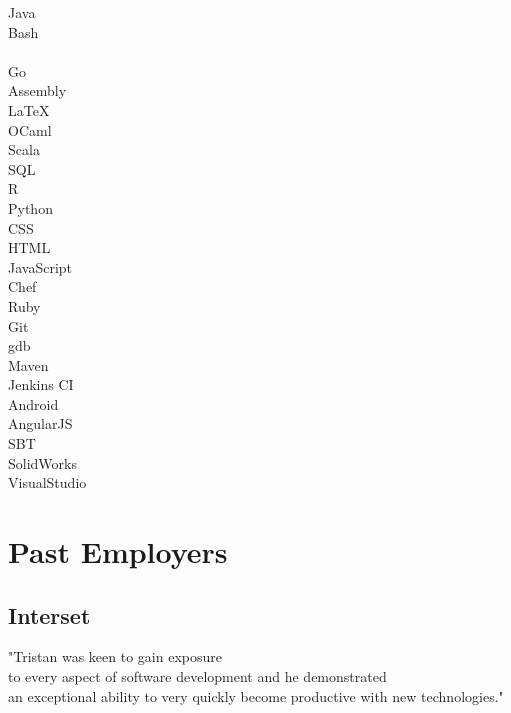 \documentclass[letterpaper]{deedy-resume-modified} %
\begin{document}
\begin{minipage}[t]{0.32\textwidth}
Java \tab {\bf + + + + +}\\
Bash \tab {\bf + + + + +}\\
\CPP \tab {\bf + + + +}\\
Go \tab {\bf + + +}\\
Assembly \tab {\bf + + +}\\
\LaTeX \tab {\bf + + +}\\
OCaml \tab {\bf + + +}\\
Scala \tab {\bf + + +}\\
SQL \tab {\bf + + +}\\
R \tab {\bf + + +}\\
Python \tab {\bf + + +}\\
CSS \tab {\bf + + +}\\
HTML \tab {\bf + + +}\\
JavaScript \tab {\bf + +}\\
Chef \tab {\bf + +}\\
Ruby \tab {\bf + +}\\

\sectionspace
{}
Git \tab {\bf + + + + +}\\
gdb \tab {\bf + + + +}\\
Maven \tab {\bf + + + +}\\
Jenkins CI \tab {\bf + + + +}\\
Android \tab {\bf + + +}\\
AngularJS \tab {\bf + + +}\\
SBT \tab {\bf + + +}\\
SolidWorks \tab {\bf + +}\\
VisualStudio \tab {\bf + +}\\

\sectionspace


\section{Past Employers}
\subsection{Interset}
"Tristan was keen to gain exposure\\to every aspect of software development and he demonstrated\\an exceptional ability to very quickly become productive with new technologies." \\

\end{minipage} %
\end{document}
